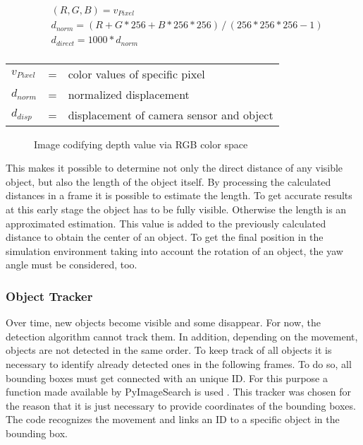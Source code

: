 \begin{equation}
	\label{eq:distance}
	\begin{aligned}
		& (R, G, B) = v_{Pixel}\\
		& d_{norm} = (R+G*256+B*256*256)\,/\,(256*256*256-1)\\
		& d_{direct} = 1000 * d_{norm}\\
	\end{aligned}
\end{equation}
\begin{table}[!h]
	\begin{center}
		\begin{tabular}{l c l}
			$v_{Pixel}$ & = & color values of specific pixel\\
			$d_{norm}$ & = &  normalized displacement\\
			$d_{disp}$ & = & displacement of camera sensor and object\\
		\end{tabular}
	\end{center}
\end{table}


\begin{figure}[b]
	\centering
	\caption{Image codifying depth value via RGB color space}
	\label{fig:depth image}
\end{figure}

This makes it possible to determine not only the direct distance of any visible object, but also the length of the object itself. By processing the calculated distances in a frame it is possible to estimate the length. To get accurate results at this early stage the object has to be fully visible. Otherwise the length is an approximated estimation. 
This value is added to the previously calculated distance to obtain the center of an object. To get the final position in the simulation environment taking into account the rotation of an object, the yaw angle must be considered, too.\\

\subsubsection{Object Tracker}
Over time, new objects become visible and some disappear. For now, the detection algorithm cannot track them. In addition, depending on the movement, objects are not detected in the same order. To keep track of all objects it is necessary to identify already detected ones in the following frames. To do so, all bounding boxes must get connected with an unique \ac{ID}. For this purpose a function made available by PyImageSearch is used \cite{Tracker}. This tracker was chosen for the reason that it is just necessary to provide coordinates of the bounding boxes. The code recognizes the movement and links an ID to a specific object in the bounding box.\\